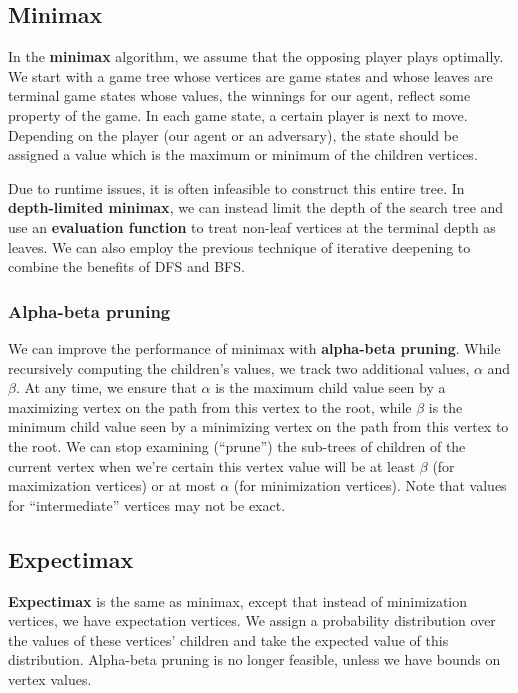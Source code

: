 \documentclass[12pt]{article}
\begin{document}
\subsection{Minimax}

In the \textbf{minimax} algorithm, we assume that the opposing player plays optimally. We start with a game tree whose vertices are game states and whose leaves are terminal game states whose values, the winnings for our agent, reflect some property of the game. In each game state, a certain player is next to move. Depending on the player (our agent or an adversary), the state should be assigned a value which is the maximum or minimum of the children vertices.

Due to runtime issues, it is often infeasible to construct this entire tree. In \textbf{depth-limited minimax}, we can instead limit the depth of the search tree and use an \textbf{evaluation function} to treat non-leaf vertices at the terminal depth as leaves. We can also employ the previous technique of iterative deepening to combine the benefits of DFS and BFS.

\subsubsection{Alpha-beta pruning}

We can improve the performance of minimax with \textbf{alpha-beta pruning}. While recursively computing the children's values, we track two additional values, $\alpha$ and $\beta$. At any time, we ensure that $\alpha$ is the maximum child value seen by a maximizing vertex on the path from this vertex to the root, while $\beta$ is the minimum child value seen by a minimizing vertex on the path from this vertex to the root. We can stop examining (``prune'') the sub-trees of children of the current vertex when we're certain this vertex value will be at least $\beta$ (for maximization vertices) or at most $\alpha$ (for minimization vertices). Note that values for ``intermediate'' vertices may not be exact.

\subsection{Expectimax}

\textbf{Expectimax} is the same as minimax, except that instead of minimization vertices, we have expectation vertices. We assign a probability distribution over the values of these vertices' children and take the expected value of this distribution. Alpha-beta pruning is no longer feasible, unless we have bounds on vertex values.
\end{document}
